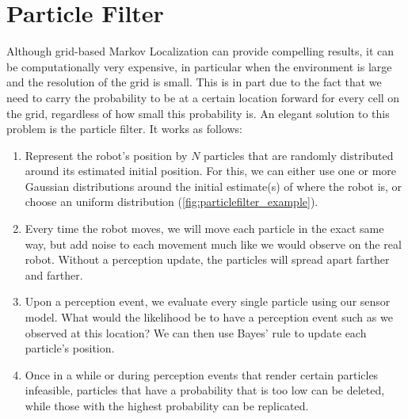 

\section{Particle Filter}
Although grid-based Markov Localization can provide compelling results, it can be computationally very expensive, in particular when the environment is large and the resolution of the grid is small. This is in part due to the fact that we need to carry the probability to be at a certain location forward for every cell on the grid, regardless of how small this probability is. An elegant solution to this problem is the particle filter. It works as follows:
\begin{enumerate}
\item Represent the robot's position by $N$ particles that are randomly distributed around its estimated initial position. For this, we can either use one or more Gaussian distributions around the initial estimate(s) of where the robot is, or choose an uniform distribution (\cref{fig:particlefilter_example}).
\item Every time the robot moves, we will move each particle in the exact same way, but add noise to each movement much like we would observe on the real robot. Without a perception update, the particles will spread apart farther and farther.
\item Upon a perception event, we evaluate every single particle using our sensor model. What would the likelihood be to have a perception event such as we observed at this location? We can then use Bayes' rule to update each particle's position.
\item Once in a while or during perception events that render certain particles infeasible, particles that have a probability that is too low can be deleted, while those with the highest probability can be replicated.
\end{enumerate}

